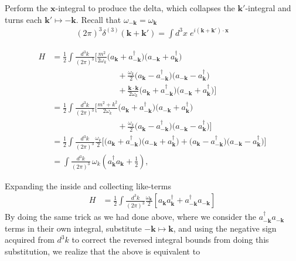 \documentclass[12pt]{article}
\newcommand{\w}{\omega}
\newcommand{\wk}{\omega_{\mathbf{k}}}
\begin{document}
Perform the \(\mathbf{x}\)-integral to produce the delta, which collapses the
\(\mathbf{k}'\)-integral and turns each $\mathbf{k}' \mapsto -\mathbf{k}$.
Recall that $\w_{-\mathbf{k}} = \wk$
\[
\begin{aligned}
(2\pi)^3\delta^{(3)}(\mathbf{k}+\mathbf{k}') = \int d^3x\;
e^{i(\mathbf{k}+\mathbf{k}')\cdot\mathbf{x}}
\end{aligned}
\]

\begin{align*}
H &= \frac{1}{2}\int\frac{d^3k}{(2\pi)^3}\Bigg[
    \frac{m^2}{2\omega_k}\bigl(a_{\mathbf k}+a_{-\mathbf k}^\dagger\bigr)
    \bigl(a_{-\mathbf k}+a_{\mathbf k}^\dagger\bigr)\\
&\qquad\qquad\qquad\qquad
    +\frac{\omega_k}{2}\bigl(a_{\mathbf k}-a_{-\mathbf k}^\dagger\bigr)
    \bigl(a_{-\mathbf k}-a_{\mathbf k}^\dagger\bigr)\\
&\qquad\qquad\qquad\qquad
    +\frac{\mathbf k\!\cdot\!\mathbf k}{2\omega_k}\bigl(a_{\mathbf k}+a_{-\mathbf k}^\dagger\bigr)
    \bigl(a_{-\mathbf k}+a_{\mathbf k}^\dagger\bigr)
\Bigg] \\[6pt]
&= \frac{1}{2}\int\frac{d^3k}{(2\pi)^3}\Bigg[
    \frac{m^2+k^2}{2\omega_k}\bigl(a_{\mathbf k}+a_{-\mathbf k}^\dagger\bigr)
    \bigl(a_{-\mathbf k}+a_{\mathbf k}^\dagger\bigr)\\
&\qquad\qquad\qquad\qquad
    +\frac{\omega_k}{2}\bigl(a_{\mathbf k}-a_{-\mathbf k}^\dagger\bigr)
    \bigl(a_{-\mathbf k}-a_{\mathbf k}^\dagger\bigr)
\Bigg] \\[6pt]
&= \frac{1}{2}\int\frac{d^3k}{(2\pi)^3}\frac{\omega_k}{2}\Big[
    \bigl(a_{\mathbf k}+a_{-\mathbf k}^\dagger\bigr)\bigl(a_{-\mathbf k}+a_{\mathbf k}^\dagger\bigr)
    +\bigl(a_{\mathbf k}-a_{-\mathbf k}^\dagger\bigr)\bigl(a_{-\mathbf k}-a_{\mathbf k}^\dagger\bigr)
\Big] \\[6pt]
&= \int\frac{d^3k}{(2\pi)^3}\,\omega_k\!\left(a_{\mathbf k}^\dagger a_{\mathbf k} + \tfrac12\right),
\end{align*}

Expanding the inside and collecting like-terms
\begin{align*}
    H &= \frac{1}{2} \int \frac{d^3k}{(2\pi)^3} \frac{\wk}{2}
    \left[ a_{\mathbf{k}}a_{\mathbf{k}}^{\dagger} +
    a_{\mathbf{-k}}^{\dagger}a_{\mathbf{-k}} \right]
\end{align*}
By doing the same trick as we had done above, where we consider the 
$a_{\mathbf{-k}}^{\dagger}a_{\mathbf{-k}}$ terms in their own integral, 
substitute $-\mathbf{k} \mapsto \mathbf{k}$, and using the negative sign 
acquired from $d^3k$ to correct the reversed integral bounds from doing this
substitution, we realize that the above is equivalent to
\end{document}
